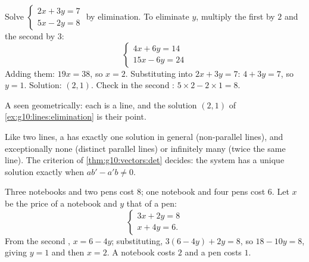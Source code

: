 \begin{example}\label{ex:g10:lines:elimination}
Solve $\begin{cases} 2x + 3y = 7 \\ 5x - 2y = 8 \end{cases}$ by
elimination. To eliminate $y$, multiply the first  by $2$ and the
second by $3$:
\[
\begin{cases}
4x + 6y = 14 \\
15x - 6y = 24
\end{cases}
\]
Adding them: $19x = 38$, so $x = 2$. Substituting into $2x + 3y = 7$:
$4 + 3y = 7$, so $y = 1$. Solution: $(2, 1)$. Check in the second
: $5 \times 2 - 2 \times 1 = 8$.
\end{example}

\begin{omfigure}

{\small A  seen geometrically: each  is a line, and
the solution $(2,1)$ of \cref{ex:g10:lines:elimination} is their
 point.}
\end{omfigure}

\begin{remark}
Like two lines, a  has exactly one solution in general
(non-parallel lines), and exceptionally none (distinct parallel lines) or
infinitely many (twice the same line). The criterion of
\cref{thm:g10:vectors:det} decides: the system has a unique solution
exactly when $ab' - a'b \neq 0$.
\end{remark}

\begin{example}\label{ex:g10:lines:modeling}
Three notebooks and two pens cost $8$; one notebook and four pens cost
$6$. Let $x$ be the price of a notebook and $y$ that of a pen:
\[
\begin{cases}
3x + 2y = 8 \\
x + 4y = 6 .
\end{cases}
\]
From the second , $x = 6 - 4y$; substituting,
$3(6 - 4y) + 2y = 8$, so $18 - 10y = 8$, giving $y = 1$ and then
$x = 2$. A notebook costs $2$ and a pen costs $1$.
\end{example}

